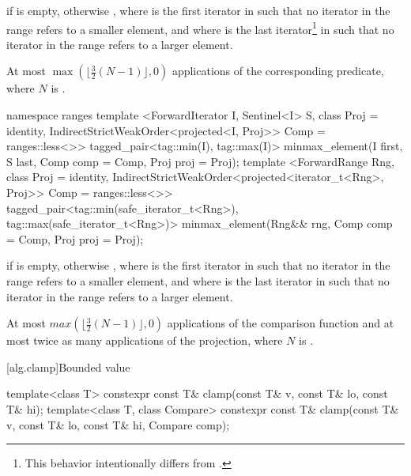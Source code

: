\begin{itemdescr}
\pnum
\returns
{} if  is empty, otherwise
, where  is
the first iterator in  such that no iterator in the range refers
to a smaller element, and where  is the last iterator\footnote{This behavior
intentionally differs from .}
in  such that no iterator in the range refers to a larger element.

\pnum
\complexity
At most
$\max(\bigl\lfloor{\frac{3}{2}} (N-1)\bigr\rfloor, 0)$
applications of the corresponding predicate, where $N$ is .
\end{itemdescr}

\begin{addedblock}
%
\begin{itemdecl}
namespace ranges {
  template <ForwardIterator I, Sentinel<I> S, class Proj = identity,
            IndirectStrictWeakOrder<projected<I, Proj>> Comp = ranges::less<>>
    tagged_pair<tag::min(I), tag::max(I)>
      minmax_element(I first, S last, Comp comp = Comp{}, Proj proj = Proj{});
  template <ForwardRange Rng, class Proj = identity,
            IndirectStrictWeakOrder<projected<iterator_t<Rng>, Proj>> Comp = ranges::less<>>
    tagged_pair<tag::min(safe_iterator_t<Rng>), tag::max(safe_iterator_t<Rng>)>
      minmax_element(Rng&& rng, Comp comp = Comp{}, Proj proj = Proj{});
}
\end{itemdecl}

\begin{itemdescr}
\pnum
\returns
{} if  is empty, otherwise
, where  is
the first iterator in  such that no iterator in the range refers to a smaller
element, and where  is the last iterator in  such that no iterator
in the range refers to a larger element.

\pnum
\complexity
At most
$max(\lfloor{\frac{3}{2}} (N-1)\rfloor, 0)$
applications of the comparison function and
at most twice as many applications of the projection,
where $N$ is .
\end{itemdescr}
\end{addedblock}

[alg.clamp]{Bounded value}

%
\begin{itemdecl}
template<class T>
  constexpr const T& clamp(const T& v, const T& lo, const T& hi);
template<class T, class Compare>
  constexpr const T& clamp(const T& v, const T& lo, const T& hi, Compare comp);
\end{itemdecl}

